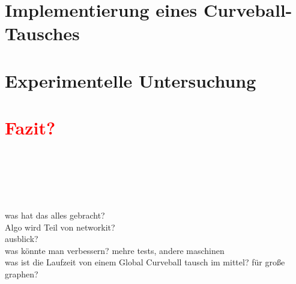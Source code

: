\documentclass[a4paper, 11pt]{scrbook}
\theoremstyle{plain} %
\theoremstyle{definition} %
\newcommand{\gc}{Global Curveball}
\newcommand{\ct}{Curveball-Tausch}
\newcommand{\red}[1]{\textcolor{red}{\textbf{#1}}}
\begin{document}


\chapter{Implementierung eines \ct{es} }





\chapter{Experimentelle Untersuchung}












\chapter{\red{Fazit?}}



~\\
\\
\\
\\
\\
was hat das alles gebracht? \\
Algo wird Teil von networkit?\\
ausblick?\\
was könnte man verbessern? mehre tests, andere maschinen
\\
was ist die Laufzeit von einem \gc{} tausch im mittel? für große graphen?
\end{document}
